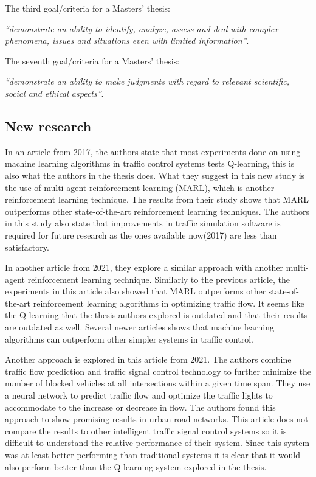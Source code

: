 \documentclass[10pt, a4paper]{article}
\begin{document}
The third goal/criteria for a Masters' thesis:

\textit{``demonstrate an ability to identify, analyze, assess and deal with complex phenomena, issues and situations even with limited information''}.
\newline

The seventh goal/criteria for a Masters' thesis:

\textit{``demonstrate an ability to make judgments with regard to relevant scientific, social and ethical aspects''}.

\subsection{New research}
In an article from 2017\cite{marl}, the authors state that most experiments done on using machine learning algorithms in traffic control systems tests Q-learning,
this is also what the authors in the thesis does. What they suggest in this new study is the use of multi-agent reinforcement learning (MARL), which is another reinforcement
learning technique. The results from their study shows that MARL outperforms other state-of-the-art reinforcement learning techniques.
The authors in this study also state that improvements in traffic simulation software is required for future research as the ones available now(2017) are
less than satisfactory.

In another article from 2021\cite{marl2}, they explore a similar approach with another multi-agent reinforcement learning technique. Similarly to the previous article,
the experiments in this article also showed that MARL outperforms other state-of-the-art reinforcement learning algorithms in optimizing traffic flow.
It seems like the Q-learning that the thesis authors explored is outdated and that their results are outdated as well. Several newer articles shows that
machine learning algorithms can outperform other simpler systems in traffic control.

Another approach is explored in this article from 2021\cite{urban}. The authors combine traffic flow prediction and traffic signal control technology to
further minimize the number of blocked vehicles at all intersections within a given time span. They use a neural network to predict traffic flow and optimize
the traffic lights to accommodate to the increase or decrease in flow. The authors found this approach to show promising results in urban road networks.
This article does not compare the results to other intelligent traffic signal control systems so it is difficult to understand the relative performance
of their system. Since this system was at least better performing than traditional systems it is clear that it would also perform better than the Q-learning
system explored in the thesis.
\end{document}
